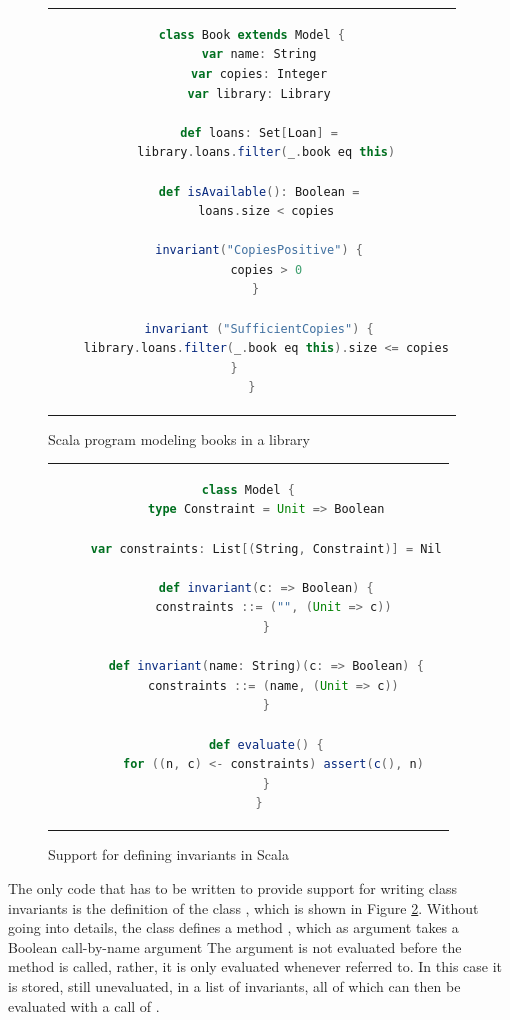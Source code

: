 \begin{figure}
\begin{center}
\begin{tabular}{c}
\begin{lstlisting}[language=scala]
class Book extends Model {
  var name: String
  var copies: Integer
  var library: Library

  def loans: Set[Loan] =
    library.loans.filter(_.book eq this)

  def isAvailable(): Boolean =
    loans.size < copies
      
  invariant("CopiesPositive") {
    copies > 0
  } 
       
  invariant ("SufficientCopies") {
    library.loans.filter(_.book eq this).size <= copies
  }       
}
\end{lstlisting}
\end{tabular}
\end{center}
\caption{Scala program modeling books in a library}
\label{fig:book-scala}
\end{figure}

\begin{figure}[htb]
\begin{center}
\begin{tabular}{c}
\begin{lstlisting}[language=scala]
   class Model {
     type Constraint = Unit => Boolean

     var constraints: List[(String, Constraint)] = Nil

     def invariant(c: => Boolean) {
       constraints ::= ("", (Unit => c))
     }

     def invariant(name: String)(c: => Boolean) {
       constraints ::= (name, (Unit => c))
     }

     def evaluate() {
       for ((n, c) <- constraints) assert(c(), n)
     }
   }
\end{lstlisting}
\end{tabular}
\end{center}
\label{fig:invariant-scala}
\caption{Support for defining invariants in Scala}
\end{figure}

The only code that has to be written to provide support for writing
class invariants is the definition of the class , which is shown in Figure \ref{fig:invariant-scala}. Without going into details, the class defines a method ,
which as argument takes a Boolean call-by-name argument 
The argument is not evaluated before the method is called, 
rather, it is only evaluated whenever referred to. In this case
it is stored, still unevaluated, in a list of invariants, all
of which can then be evaluated with a call of .



